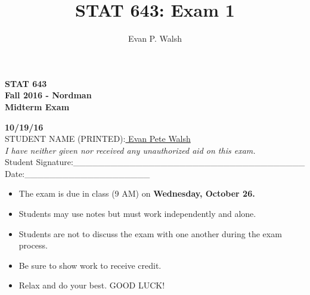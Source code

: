 \documentclass[12pt]{article}
\title{STAT 643: Exam 1}
\author{Evan P. Walsh}
\begin{document}
\vspace*{3cm}
\begin{center}{\Large


\bf STAT 643  \\   Fall 2016 - Nordman \\
\vspace{.2cm}  Midterm Exam \\}
\vspace{.2cm} {\large {\bf 10/19/16}  \\
  \vspace{2cm} STUDENT NAME (PRINTED):\underline{ Evan Pete Walsh \hspace{5mm}}\\
\vspace{1.5cm} {\em I have neither given nor received any unauthorized aid on this exam.}\\
\vspace{1cm} Student
Signature:\_\_\_\_\_\_\_\_\_\_\_\_\_\_\_\_\_\_\_\_\_\_\_\_\_\_\_\_\_\_\_\_\_\_\_\_\_ Date:\_\_\_\_\_\_\_\_\_\_\_\_\_\_\_\_\_\_\_\_
}
\end{center}

\vspace*{2cm}
\begin{center}{\large

\begin{itemize}
\item The exam is due in class (9 AM) on \textbf{Wednesday, October 26.}
\item Students may use notes but must work independently and alone.
 \item Students are not to discuss the exam with one another during the exam process.
\item Be sure to show work to receive  credit.
\item Relax and do your best.  GOOD LUCK!
\end{itemize}



 }
\end{center}
\newpage
\end{document}
